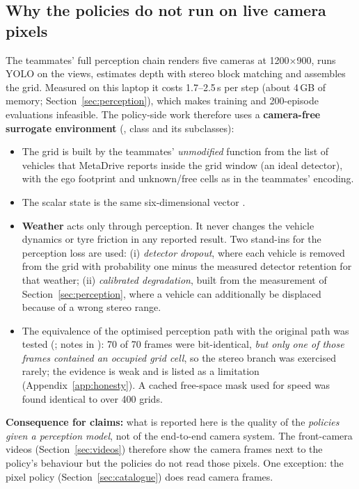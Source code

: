 \subsection{Why the policies do not run on live camera pixels}\label{sec:surrogate}
The teammates' full perception chain renders five cameras at 1200$\times$900, runs YOLO on the views, estimates depth with stereo block matching and assembles the grid. Measured on this laptop it costs 1.7--2.5\,s per step
(about 4\,GB of memory; Section~\ref{sec:perception}), which makes training and 200-episode evaluations infeasible. The policy-side work therefore uses a \textbf{camera-free surrogate environment} (, class  and its subclasses):
\begin{itemize}
\item The grid is built by the teammates' \emph{unmodified} function  from the list of vehicles that MetaDrive reports inside the grid window (an ideal detector), with the ego footprint and unknown/free cells as in the teammates' encoding.
\item The scalar state is the same six-dimensional vector .
\item \textbf{Weather} acts only through perception. It never changes the vehicle dynamics or tyre friction in any reported result. Two stand-ins for the perception loss are used: (i) \emph{detector dropout}, where each vehicle is removed from the grid with probability one minus the measured detector retention
  for that weather; (ii) \emph{calibrated degradation}, built from the measurement of Section~\ref{sec:perception}, where a vehicle can additionally be displaced because of a wrong stereo range.
\item The equivalence of the optimised perception path with the original path was tested (; notes in ): 70 of 70 frames were bit-identical, \emph{but only one of those frames contained an occupied grid cell}, so the stereo branch was exercised rarely; the evidence is weak and is listed as a limitation (Appendix~\ref{app:honesty}).
  A cached free-space mask used for speed was found identical to  over 400 grids.
\end{itemize}
\textbf{Consequence for claims:} what is reported here is the quality of the \emph{policies given a perception model}, not of the end-to-end camera system. The front-camera videos (Section~\ref{sec:videos}) therefore show the camera frames next to the policy's behaviour but the policies do not read those pixels.
One exception: the pixel policy  (Section~\ref{sec:catalogue}) does read camera frames.

